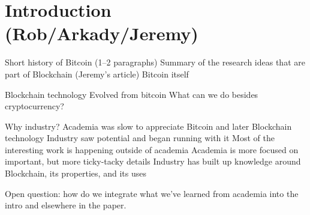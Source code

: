 \section{Introduction (Rob/Arkady/Jeremy)}
Short history of Bitcoin (1--2 paragraphs)
	Summary of the research ideas that are part of Blockchain (Jeremy's article)
	Bitcoin itself
	
Blockchain technology
	Evolved from bitcoin
	What can we do besides cryptocurrency?
	
Why industry?
	Academia was slow to appreciate Bitcoin and later Blockchain technology
	Industry saw potential and began running with it
	Most of the interesting work is happening outside of academia
		Academia is more focused on important, but more ticky-tacky details
		Industry has built up knowledge around Blockchain, its properties, and its uses

Open question: how do we integrate what we've learned from academia into the intro and elsewhere in the paper.